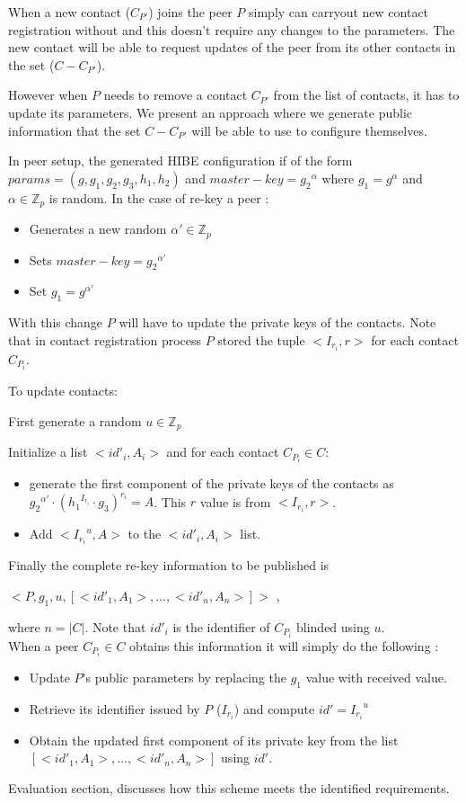 When a new contact ($C_{P'}$) joins the peer $P$ simply can carryout new contact registration without and this doesn't require any changes to the parameters. The new contact will be able to request updates of the peer from its other contacts in the set ($C - C_{P'}$). 

However when $P$ needs to remove a contact $C_{P'}$ from the list of contacts, it has to update its parameters. We present an approach where we generate public information that the set $C - C_{P'}$ will be able to use to configure themselves.

In peer setup, the generated HIBE configuration if of the form  $params = (g, g_1, g_2, g_3, h_1, h_2)$ and $master-key = {g_2}^{\alpha}$ where $g_1 = g^{\alpha}$ and $\alpha \in \mathbb{Z}_p$ is random. In the case of re-key a peer :
\begin{itemize}
\item Generates a new random $\alpha' \in \mathbb{Z}_p$
\item Sets $master-key = {g_2}^{\alpha'}$
\item Set $g_1 = g^{\alpha'}$
\end{itemize}

With this change $P$ will have to update the private keys of the contacts. Note that in contact registration process $P$ stored the tuple $<I_{r_i}, r>$ for each contact $C_{P_i}$. 

To update contacts:

First generate a random $u \in \mathbb{Z}_p$

Initialize a list $<{id'}_i, A_i>$ and for each contact $C_{P_i} \in C$:
\begin{itemize}
\item generate the first component of the private keys of the contacts as ${{g_2}^{\alpha'}} \cdot {({{h_1}^{I_{r_i}}} \cdot {g_3} )}^{r_i} = A$. This $r$ value is from $<I_{r_i}, r>$.
\item Add  $<{{I_{r_i}}^u}, A>$ to the $<{id'}_i, A_i>$ list.
\end{itemize}

Finally the complete re-key information to be published is 
\begin{center}
$<P, g_1, u, [<{id'}_1, A_1>, ...,  <{id'}_n, A_n>]>$ ,
\end{center} where $n = |C|$. Note that ${id'}_i$ is the identifier of $C_{P_i}$ blinded using $u$.\\

When a peer $C_{P_i} \in C$ obtains this information it will simply do the following :
\begin{itemize}
\item Update $P$'s public parameters by replacing the $g_1$ value with received value.
\item Retrieve its identifier issued by $P$ ($I_{r_i}$) and compute $id' = {I_{r_i}}^u$
\item Obtain the updated first component of its private key from the list $[<{id'}_1, A_1>, ...,  <{id'}_n, A_n>]$ using $id'$.\\
\end{itemize}

Evaluation section, discusses how this scheme meets the identified requirements.
